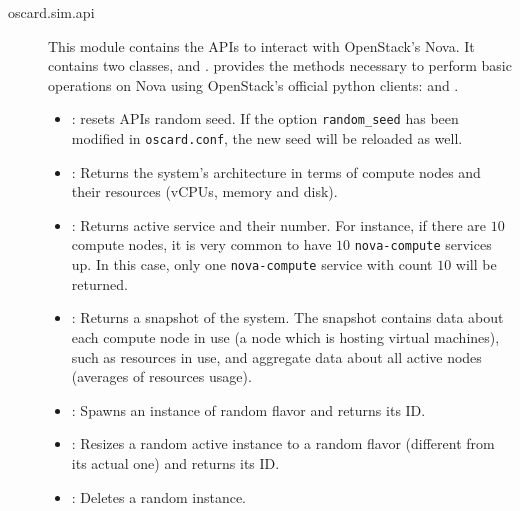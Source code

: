 \begin{description}
	\item[oscard.sim.api] This module contains the APIs to interact with OpenStack's Nova.
	It contains two classes,  and .  provides the methods necessary to perform basic operations on Nova using OpenStack's official python clients:  and .

		\begin{itemize}
			\item {}: resets APIs random seed. If the option \texttt{random\_seed} has been modified in \texttt{oscard.conf}, the new seed will be reloaded as well.
			\item {}: Returns the system's architecture in terms of compute nodes and their resources (vCPUs, memory and disk).
			\item {}: Returns active service and their number. For instance, if there are $10$ compute nodes, it is very common to have $10$ \texttt{nova-compute} services up. In this case, only one \texttt{nova-compute} service with count $10$ will be returned.
			\item {}: Returns a snapshot of the system. The snapshot contains data about each compute node in use (a node which is hosting virtual machines), such as resources in use, and aggregate data about all active nodes (averages of resources usage). 
			\item {}: Spawns an instance of random flavor and returns its ID.
			\item {}: Resizes a random active instance to a random flavor (different from its actual one) and returns its ID.
			\item {}: Deletes a random instance.
		\end{itemize}


\end{description}
